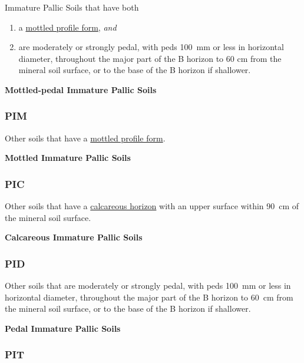 \documentclass[
  letterpaper,
  DIV=11,
  numbers=noendperiod]{scrreprt}
\providecommand{\tightlist}{%
  \setlength{\itemsep}{0pt}\setlength{\parskip}{0pt}}\usepackage{longtable,booktabs,array}
\begin{document}
Immature Pallic Soils that have both

\begin{enumerate}
\def\labelenumi{\arabic{enumi}.}
\tightlist
\item
  a \protect\hyperlink{sec-diag-mottpf}{mottled profile form},
  \emph{and}
\item
  are moderately or strongly pedal, with peds 100~mm or less in
  horizontal diameter, throughout the major part of the B horizon to 60
  cm from the mineral soil surface, or to the base of the B horizon if
  shallower.
\end{enumerate}

\textbf{Mottled-pedal Immature Pallic Soils}

\hypertarget{sec-key-PIM}{%
\subsubsection{\texorpdfstring{\textbf{PIM}}{PIM}}\label{sec-key-PIM}}

Other soils that have a \protect\hyperlink{sec-diag-mottpf}{mottled
profile form}.

\textbf{Mottled Immature Pallic Soils}

\hypertarget{sec-key-PIC}{%
\subsubsection{\texorpdfstring{\textbf{PIC}}{PIC}}\label{sec-key-PIC}}

Other soils that have a \protect\hyperlink{sec-diag-calch}{calcareous
horizon} with an upper surface within 90~cm of the mineral soil surface.

\textbf{Calcareous Immature Pallic Soils}

\hypertarget{sec-key-PID}{%
\subsubsection{\texorpdfstring{\textbf{PID}}{PID}}\label{sec-key-PID}}

Other soils that are moderately or strongly pedal, with peds 100~mm or
less in horizontal diameter, throughout the major part of the B horizon
to 60~cm from the mineral soil surface, or to the base of the B horizon
if shallower.

\textbf{Pedal Immature Pallic Soils}

\hypertarget{sec-key-PIT}{%
\subsubsection{\texorpdfstring{\textbf{PIT}}{PIT}}\label{sec-key-PIT}}
\end{document}
